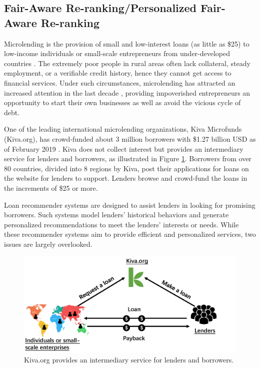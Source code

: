 
\subsection{Fair-Aware Re-ranking/Personalized Fair-Aware Re-ranking}

Microlending is the provision of small and low-interest loans (as little as \$25) to low-income individuals or small-scale entrepreneurs from under-developed countries  \cite{yunus1998banker}. The extremely poor people in rural areas often lack collateral, steady employment, or a verifiable credit history, hence they cannot get access to financial services. Under such circumstances, microlending has attracted an increased attention in the last decade \cite{chen2017microfinance}, providing impoverished entrepreneurs an opportunity to start their own businesses as well as avoid the vicious cycle of debt.

One of the leading international microlending organizations, Kiva Microfunds (Kiva.org), has crowd-funded about 3 million borrowers with \$1.27 billion USD as of February 2019 \cite{kiva}. Kiva does not collect interest but provides an intermediary service for lenders and borrowers, as illustrated in Figure \ref{fig:kiva_process}. Borrowers from over 80 countries, divided into 8 regions by Kiva, post their applications for loans on the website for lenders to support. Lenders browse and crowd-fund the loans in the increments of \$25 or more. 

Loan recommender systems \cite{choo2014gather,choo2014understanding} are designed to assist lenders in looking for promising borrowers. Such systems model lenders' historical behaviors and generate personalized recommendations to meet the lenders' interests or needs. While these recommender systems aim to provide efficient and personalized services, two issues are largely overlooked.

\begin{figure}
\includegraphics[width=0.98\columnwidth]{imgs/far/microlending.png}
\caption{Kiva.org provides an intermediary service for lenders and borrowers.}
\label{fig:kiva_process}
\end{figure}

